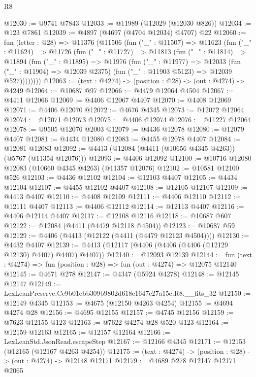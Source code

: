 \begin{lexlean}{R8}
\begin{coremodule}
@12030 := @9741 @7843
@12033 := @11989 (@12029 (@12030 @826))
@12034 := @123 @7861
@12039 := @4897 (@4697 (@4704 @12034) @4707) @22
@12060 := fun (letter : @28) =>
  @11376
    (@11506
      (fun ("_" : @11507) =>
      @11623
        (fun ("_" : @11624) =>
        @11726
          (fun ("_" : @11727) =>
          @11813
            (fun ("_" : @11814) =>
            @11894
              (fun ("_" : @11895) =>
              @11976
                (fun ("_" : @11977) =>
                @12033
                  (fun ("_" : @11904) => @12039 @2375)
                  (fun ("_" : @11903 @5123) => @12039 @527))))))))
@12063 := (text : @4274) -> (position : @28) -> (out : @4274) -> @4249
@12064 := @10687 @97
@12066 := @4479 @12064 @4504
@12067 := @4411 @12066
@12069 := @4406 @12067 @4407
@12070 := @4408 @12069
@12071 := @4406 @12070
@12072 := @4676 @4345
@12073 := @12072 @12064
@12074 := @12071 @12073
@12075 := @4406 @12074
@12076 := @11227 @12064
@12078 := @9505 @12076 @2003
@12079 := @4436 @12078
@12080 := @12079 @4407
@12081 := @4434 @12080
@12083 := @4455 @12078 @4407
@12084 := @12081 @12083
@12092 := @4413 (@12084 (@4411 (@10656 @4345 @4263)) (@5767 (@11354 @12076)))
@12093 := @4406 @12092
@12100 := @10716 @12080 @12083 (@10660 @4345 @4263) (@11357 @12076)
@12102 := @10581 @12100 @526
@12103 := @4436 @12102
@12104 := @12103 @4407
@12105 := @4434 @12104
@12107 := @4455 @12102 @4407
@12108 := @12105 @12107
@12109 := @4413 @4407
@12110 := @4408 @12109
@12111 := @4406 @12110
@12112 := @12111 @4407
@12113 := @4406 @12112
@12114 := @12113 @4407
@12116 := @4406 @12114 @4407
@12117 := @12108 @12116
@12118 := @10687 @607
@12122 := @12084 (@4411 (@4479 @12118 @4504))
@12123 := @10687 @59
@12129 := @4406 (@4413 (@12122 (@4411 (@4479 @12123 @4504))))
@12130 := @4432 @4407
@12139 := @4413 (@12117 (@4406 (@4406 (@4406 (@12129 @12130) @4407) @4407) @4407))
@12140 := @12093 @12139
@12144 := fun (text : @4274) => fun (position : @28) => fun (out : @4274) => @12075 @12140
@12145 := @4671 @278
@12147 := @4347 (@5924 @4278)
@12148 := @12145 @12147
@12149 := LexLeanPreserve.Ce9b01ebb309b9802d618c1647c27a15e.R8.__fits_32
@12150 := @12149 @4345
@12153 := @4675 (@12150 @4263 @4254)
@12155 := @4694 @4274 @28
@12156 := @4695 @12155
@12157 := @4745 @12156
@12159 := @7623 @12155 @123
@12163 := @7622 @4274 @28 @520 @123
@12164 := @12159 @12163
@12165 := @12157 @12164
@12166 := LexLeanStd.JsonRead.escapeStep
@12167 := @12166 @4345
@12171 := @12153 (@12165 (@12167 @4263 @4254))
@12175 := (text : @4274) -> (position : @28) -> (out : @4274) -> @12148 @12171
@12179 := @4689 @278 @12147 @12171 @2065

\end{coremodule}
\end{lexlean}
